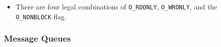 
\begin{itemize}
\item There are four legal combinations of \texttt{O\_RDONLY}, \texttt{O\_WRONLY}, and the
  \texttt{O\_NONBLOCK} flag. 
\end{itemize}
\begin{longlisting}
\end{longlisting}

\subsubsection{Message Queues}
\label{sec:message-queues}

